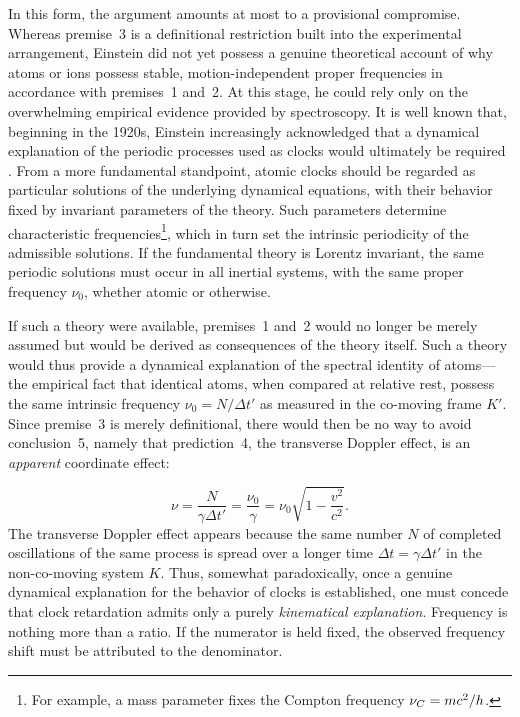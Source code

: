 \documentclass[pdflatex]{sn-jnl}
\newcommand{\tDe}{transverse Doppler effect\xspace}
\begin{document}
%
In this form, the argument amounts at most to a provisional compromise. Whereas premise~3 is a definitional restriction built into the experimental arrangement, Einstein did not yet possess a genuine theoretical account of why atoms or ions possess stable, motion-independent proper frequencies in accordance with premises~1 and~2. At this stage, he could rely only on the overwhelming empirical evidence provided by spectroscopy. It is well known that, beginning in the 1920s, Einstein increasingly acknowledged that a dynamical explanation of the periodic processes used as clocks would ultimately be required \citep{Einstein1921,Einstein1923,Einstein1924,Einstein1926}. From a more fundamental standpoint, atomic clocks should be regarded as particular solutions of the underlying dynamical equations, with their behavior fixed by invariant parameters of the theory. Such parameters determine characteristic frequencies\footnote{For example, a mass parameter fixes the Compton frequency $\nu_C={mc^2}/{h}$.}, which in turn set the intrinsic periodicity of the admissible solutions. If the fundamental theory is Lorentz invariant, the same periodic solutions must occur in all inertial systems, with the same proper frequency $\nu_0$, whether atomic or otherwise.

If such a theory were available, premises~1 and~2 would no longer be merely assumed but would be derived as consequences of the theory itself. Such a theory would thus provide a dynamical explanation of the spectral identity of atoms---the empirical fact that identical atoms, when compared at relative rest, possess the same intrinsic frequency $\nu_0 = N/\Delta t'$ as measured in the co-moving frame $K'$. Since premise~3 is merely definitional, there would then be no way to avoid conclusion~5, namely that prediction~4, the \tDe, is an \emph{apparent} coordinate effect:

\begin{equation}
\nu=\frac{N}{\gamma\Delta t'}= \frac{\nu_0}{\gamma} = \nu_0 \sqrt{1-\frac{v^2}{c^2}}.
\end{equation}
%
The \tDe appears because the same number $N$ of completed oscillations of the same process is spread over a longer time $\Delta t = \gamma \Delta t'$ in the non-co-moving system $K$. Thus, somewhat paradoxically, once a genuine dynamical explanation for the behavior of clocks is established, one must concede that clock retardation admits only a purely \emph{kinematical explanation}. Frequency is nothing more than a ratio. If the numerator is held fixed, the observed frequency shift must be attributed to the denominator.
\end{document}
